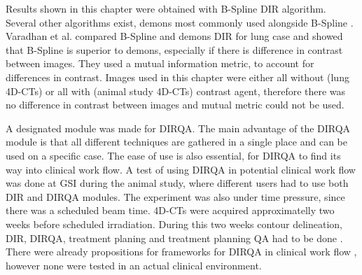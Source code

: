 Results shown in this chapter were obtained with B-Spline DIR algorithm. Several other algorithms exist, demons most commonly used alongside B-Spline \cite{Thirion1998}. Varadhan et al. compared B-Spline and demons DIR
for lung case \cite{Varadhan2013} and showed that B-Spline is superior to demons, especially if there is difference in contrast between images. They used a mutual information
metric, to account for differences in contrast. Images used in this chapter were either all without (lung 4D-CTs) or all with (animal study 4D-CTs) contrast agent, therefore there was no difference in contrast
between images and mutual metric could not be used.

A designated module was made for DIRQA. The main advantage of the DIRQA module is that all different techniques are gathered in a single place and can be used on a specific case. 
The ease of use is also essential, for DIRQA to find its way into clinical work flow.
A test of using DIRQA in potential clinical work flow was done at GSI during the animal study, where different users had to use both DIR and DIRQA modules. The experiment was also under time pressure, since there was
a scheduled beam time. 4D-CTs were acquired approximatelly two weeks before scheduled irradiation. During this two weeks contour delineation, DIR, DIRQA, treatment planing 
and treatment planning QA had to be done \cite{Lehmann2015}.
There were already propositions for frameworks for DIRQA in clinical work flow \cite{Varadhan2013}, however none were tested in an actual clinical environment.

